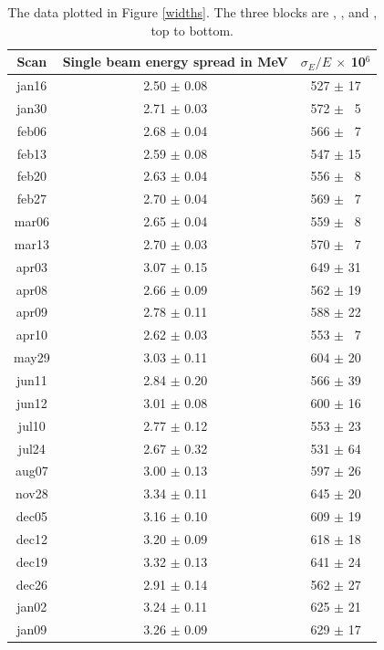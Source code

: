 \documentclass[aps,prd,preprint,superscriptaddress,tightenlines,nofootinbib,floatfix]{revtex4}
\begin{document}
\begin{table}[p]
  \begin{center}
    \renewcommand{\arraystretch}{1.25}
    \begin{tabular}{c | c c}
\mbox{\hspace{0.5 cm}} Scan \mbox{\hspace{0.5 cm}} & \mbox{\hspace{0.5 cm}} Single beam energy spread in MeV \mbox{\hspace{0.5 cm}} & \mbox{\hspace{0.5 cm}} $\sigma_E/E$ $\times$ 10$^{6}$ \mbox{\hspace{0.5 cm}} \\\hline
jan16 & 2.50 $\pm$ 0.08 & 527 $\pm$ 17 \\
jan30 & 2.71 $\pm$ 0.03 & 572 $\pm$ \textcolor{white}{0}5 \\
feb06 & 2.68 $\pm$ 0.04 & 566 $\pm$ \textcolor{white}{0}7 \\
feb13 & 2.59 $\pm$ 0.08 & 547 $\pm$ 15 \\
feb20 & 2.63 $\pm$ 0.04 & 556 $\pm$ \textcolor{white}{0}8 \\
feb27 & 2.70 $\pm$ 0.04 & 569 $\pm$ \textcolor{white}{0}7 \\
mar06 & 2.65 $\pm$ 0.04 & 559 $\pm$ \textcolor{white}{0}8 \\
mar13 & 2.70 $\pm$ 0.03 & 570 $\pm$ \textcolor{white}{0}7 \\
apr03 & 3.07 $\pm$ 0.15 & 649 $\pm$ 31 \\
apr08 & 2.66 $\pm$ 0.09 & 562 $\pm$ 19 \\
apr09 & 2.78 $\pm$ 0.11 & 588 $\pm$ 22 \\
apr10 & 2.62 $\pm$ 0.03 & 553 $\pm$ \textcolor{white}{0}7 \\\hline
may29 & 3.03 $\pm$ 0.11 & 604 $\pm$ 20 \\
jun11 & 2.84 $\pm$ 0.20 & 566 $\pm$ 39 \\
jun12 & 3.01 $\pm$ 0.08 & 600 $\pm$ 16 \\
jul10 & 2.77 $\pm$ 0.12 & 553 $\pm$ 23 \\
jul24 & 2.67 $\pm$ 0.32 & 531 $\pm$ 64 \\
aug07 & 3.00 $\pm$ 0.13 & 597 $\pm$ 26 \\\hline
nov28 & 3.34 $\pm$ 0.11 & 645 $\pm$ 20 \\
dec05 & 3.16 $\pm$ 0.10 & 609 $\pm$ 19 \\
dec12 & 3.20 $\pm$ 0.09 & 618 $\pm$ 18 \\
dec19 & 3.32 $\pm$ 0.13 & 641 $\pm$ 24 \\
dec26 & 2.91 $\pm$ 0.14 & 562 $\pm$ 27 \\
jan02 & 3.24 $\pm$ 0.11 & 625 $\pm$ 21 \\
jan09 & 3.26 $\pm$ 0.09 & 629 $\pm$ 17 \\\hline
    \end{tabular}
  \end{center}
  \caption{\label{widthstab} The data plotted in Figure \ref{widths}.
  The three blocks are \uone, \utwo, and \uthree, top to bottom.}
\end{table}
\end{document}
